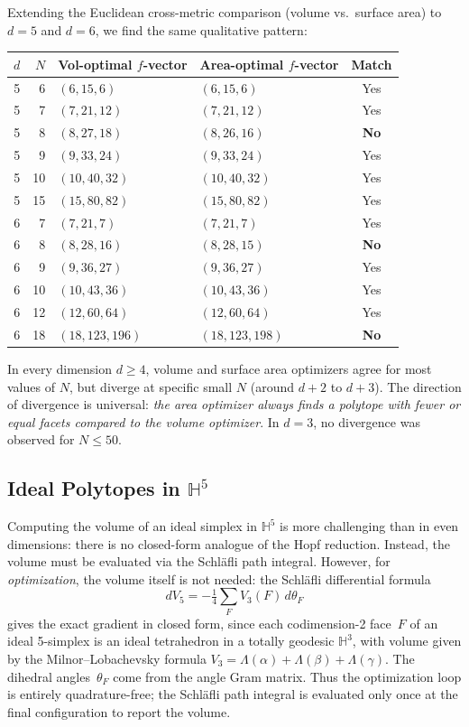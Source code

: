 \documentclass[11pt]{article}
\begin{document}
Extending the Euclidean cross-metric comparison (volume vs.\ surface area)
to $d = 5$ and $d = 6$, we find the same qualitative pattern:

\begin{center}
\begin{tabular}{r r l l c}
\toprule
$d$ & $N$ & Vol-optimal $f$-vector & Area-optimal $f$-vector & Match \\
\midrule
5 & 6  & $(6,15,6)$ & $(6,15,6)$ & Yes \\
5 & 7  & $(7,21,12)$ & $(7,21,12)$ & Yes \\
5 & 8  & $(8,27,18)$ & $(8,26,16)$ & \textbf{No} \\
5 & 9  & $(9,33,24)$ & $(9,33,24)$ & Yes \\
5 & 10 & $(10,40,32)$ & $(10,40,32)$ & Yes \\
5 & 15 & $(15,80,82)$ & $(15,80,82)$ & Yes \\
\midrule
6 & 7  & $(7,21,7)$ & $(7,21,7)$ & Yes \\
6 & 8  & $(8,28,16)$ & $(8,28,15)$ & \textbf{No} \\
6 & 9  & $(9,36,27)$ & $(9,36,27)$ & Yes \\
6 & 10 & $(10,43,36)$ & $(10,43,36)$ & Yes \\
6 & 12 & $(12,60,64)$ & $(12,60,64)$ & Yes \\
6 & 18 & $(18,123,196)$ & $(18,123,198)$ & \textbf{No} \\
\bottomrule
\end{tabular}
\end{center}

In every dimension $d \geq 4$, volume and surface area optimizers
agree for most values of $N$, but diverge at specific small $N$
(around $d+2$ to $d+3$). The direction of divergence is universal:
\emph{the area optimizer always finds a polytope with fewer or equal
facets compared to the volume optimizer}. In $d = 3$, no divergence
was observed for $N \leq 50$.

\subsection{Ideal Polytopes in $\mathbb{H}^5$}

Computing the volume of an ideal simplex in $\mathbb{H}^5$ is more
challenging than in even dimensions: there is no closed-form analogue
of the Hopf reduction.  Instead, the volume must be evaluated via the
Schl\"afli path integral.  However, for \emph{optimization}, the volume
itself is not needed: the Schl\"afli differential formula
\[
dV_5 = -\tfrac{1}{4}\sum_{F} V_3(F)\,d\theta_F
\]
gives the exact gradient in closed form, since each codimension-2 face~$F$
of an ideal 5-simplex is an ideal tetrahedron in a totally geodesic
$\mathbb{H}^3$, with volume given by the Milnor--Lobachevsky formula
$V_3 = \Lambda(\alpha) + \Lambda(\beta) + \Lambda(\gamma)$.
The dihedral angles~$\theta_F$ come from the angle Gram matrix.
Thus the optimization loop is entirely quadrature-free; the
Schl\"afli path integral is evaluated only once at the final
configuration to report the volume.
\end{document}
